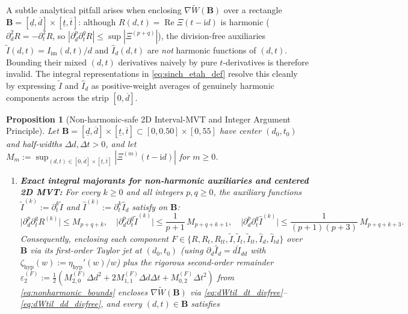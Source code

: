 \documentclass[11pt,a4paper,reqno]{amsart}
\newtheorem{proposition}[theorem]{Proposition}
\theoremstyle{definition}
\theoremstyle{remark}
\numberwithin{equation}{section}
\newcommand{\ii}{\mathrm{i}}
\newcommand{\Rea}{\operatorname{Re}}
\newcommand{\Wtil}{\widetilde{W}}
\newcommand{\etah}{\eta_{\mathrm{hyp}}}
\begin{document}
A subtle analytical pitfall arises when enclosing $\nabla\Wtil(\mathbf{B})$ over a rectangle $\mathbf{B} = [\underline{d}, \overline{d}] \times [\underline{t}, \overline{t}]$: although $R(d,t) = \Rea\Xi(t-\ii d)$ is harmonic ($\partial_d^2 R = -\partial_t^2 R$, so $|\partial_d^p\partial_t^q R| \le \sup|\Xi^{(p+q)}|$), the division-free auxiliaries $\widetilde{I}(d,t) = I_{\mathrm{im}}(d,t)/d$ and $\widehat{I}_d(d,t)$ are \emph{not} harmonic functions of $(d,t)$. Bounding their mixed $(d,t)$ derivatives naively by pure $t$-derivatives is therefore invalid. The integral representations in \eqref{eq:sinch_etah_def} resolve this cleanly by expressing $\widetilde{I}$ and $\widehat{I}_d$ as positive-weight averages of genuinely harmonic components across the strip $[0, \overline{d}]$.

\begin{proposition}[Non-harmonic-safe 2D Interval-MVT and Integer Argument Principle]\label{prop:mvt_argument}
Let $\mathbf{B} = [\underline{d}, \overline{d}] \times [\underline{t}, \overline{t}] \subset [0, 0.50] \times [0, 55]$ have center $(d_0, t_0)$ and half-widths $\Delta d, \Delta t > 0$, and let $M_m := \sup_{(d,t) \in [0, \overline{d}] \times [\underline{t}, \overline{t}]} |\Xi^{(m)}(t - \ii d)|$ for $m \ge 0$.
\begin{enumerate}
\item[\textup{(a)}] \textbf{Exact integral majorants for non-harmonic auxiliaries and centered 2D MVT:} For every $k \ge 0$ and all integers $p, q \ge 0$, the auxiliary functions $\widetilde{I}^{(k)} := \partial_t^k \widetilde{I}$ and $\widehat{I}^{(k)} := \partial_t^k \widehat{I}_d$ satisfy on $\mathbf{B}$:
\begin{equation}\label{eq:nonharmonic_bounds}
\big|\partial_d^p \partial_t^q R^{(k)}\big| \le M_{p+q+k}, \quad \big|\partial_d^p \partial_t^q \widetilde{I}^{(k)}\big| \le \frac{1}{p+1}\,M_{p+q+k+1}, \quad \big|\partial_d^p \partial_t^q \widehat{I}^{(k)}\big| \le \frac{1}{(p+1)(p+3)}\,M_{p+q+k+3}.
\end{equation}
Consequently, enclosing each component $F \in \{R, R_t, R_{tt}, \widetilde{I}, \widetilde{I}_t, \widetilde{I}_{tt}, \widehat{I}_d, \widehat{I}_{td}\}$ over $\mathbf{B}$ via its first-order Taylor jet at $(d_0,t_0)$ (using $\partial_d\widehat{I}_d = d\check{I}_{dd}$ with $\zeta_{\mathrm{hyp}}(w) := \etah'(w)/w$) plus the rigorous second-order remainder $\varepsilon_2^{(F)} := \frac{1}{2}(M_{2,0}^{(F)}\Delta d^2 + 2M_{1,1}^{(F)}\Delta d\Delta t + M_{0,2}^{(F)}\Delta t^2)$ from \eqref{eq:nonharmonic_bounds} encloses $\nabla\Wtil(\mathbf{B})$ via \eqref{eq:dWtil_dt_divfree}--\eqref{eq:dWtil_dd_divfree}, and every $(d,t) \in \mathbf{B}$ satisfies

\end{enumerate}
\end{proposition}
\end{document}
